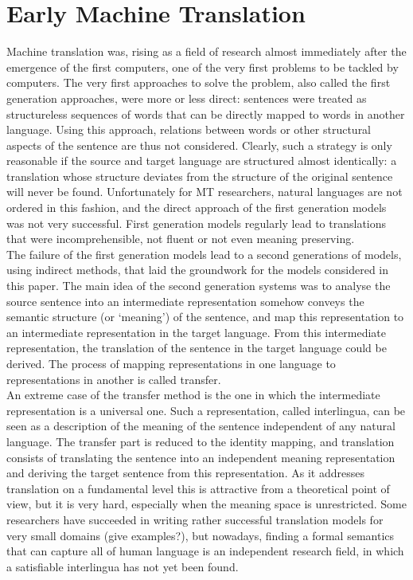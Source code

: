 \documentclass{report}
\theoremstyle{definition}
\theoremstyle{plain}
\begin{document}
\section{Early Machine Translation}
Machine translation was, rising as a field of research almost immediately after the emergence of the first computers, one of the very first problems to be tackled by computers. The very first approaches to solve the problem, also called the first generation approaches, were more or less direct: sentences were treated as structureless sequences of words that can be directly mapped to words in another language. Using this approach, relations between words or other structural aspects of the sentence are thus not considered. Clearly, such a strategy is only reasonable if the source and target language are structured almost identically: a translation whose structure deviates from the structure of the original sentence will never be found. Unfortunately for MT researchers, natural languages are not ordered in this fashion, and the direct approach of the first generation models was not very successful. First generation models regularly lead to translations that were incomprehensible, not fluent or not even meaning preserving.\\
The failure of the first generation models lead to a second generations of models, using indirect methods, that laid the groundwork for the models considered in this paper. The main idea of the second generation systems was to analyse the source sentence into an intermediate representation somehow conveys the semantic structure (or `meaning') of the sentence, and map this representation to an intermediate representation in the target language. From this intermediate representation, the translation of the sentence in the target language could be derived. The process of mapping representations in one language to representations in another is called transfer.\\
An extreme case of the transfer method is the one in which the intermediate representation is a universal one. Such a representation, called interlingua, can be seen as a description of the meaning of the sentence independent of any natural language. The transfer part is reduced to the identity mapping, and translation consists of translating the sentence into an independent meaning representation and deriving the target sentence from this representation. As it addresses translation on a fundamental level this is attractive from a theoretical point of view, but it is very hard, especially when the meaning space is unrestricted. Some researchers have succeeded in writing rather successful translation models for very small domains (give examples?), but nowadays, finding a formal semantics that can capture all of human language is an independent research field, in which a satisfiable interlingua has not yet been found.
\end{document}
